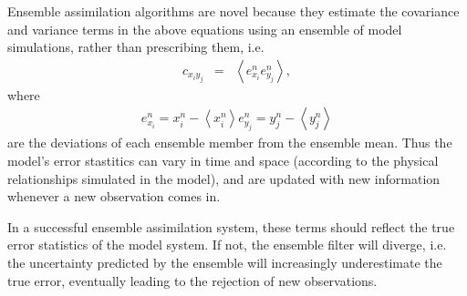 
Ensemble assimilation algorithms are novel because they estimate the covariance and variance terms in the above equations using an ensemble of model simulations, rather than prescribing them, i.e. 
\begin{eqnarray}
c_{x_iy_j} &=& 
\left<
e_{x_i}^n 
e_{y_j}^n
\right>,
\label{eq:covariance} 
\end{eqnarray}
%
%
%
where 
\begin{eqnarray}
	e_{x_i}^n = x_i^n - \left< x_i^n \right>   \label{eq:exn}
	e_{y_j}^n = y_j^n - \left< y_j^n \right>    \label{eq:eyn}
\end{eqnarray}
are the deviations of each ensemble member from the ensemble mean.
Thus the model's error stastitics can vary in time and space (according to the physical relationships simulated in the model), and are updated with new information whenever a new observation comes in.  

In a successful ensemble assimilation system, these terms should reflect the true error statistics of the model system.
If not, the ensemble filter will diverge, i.e. the uncertainty predicted by the ensemble will increasingly underestimate the true error, eventually leading to the rejection of new observations.

